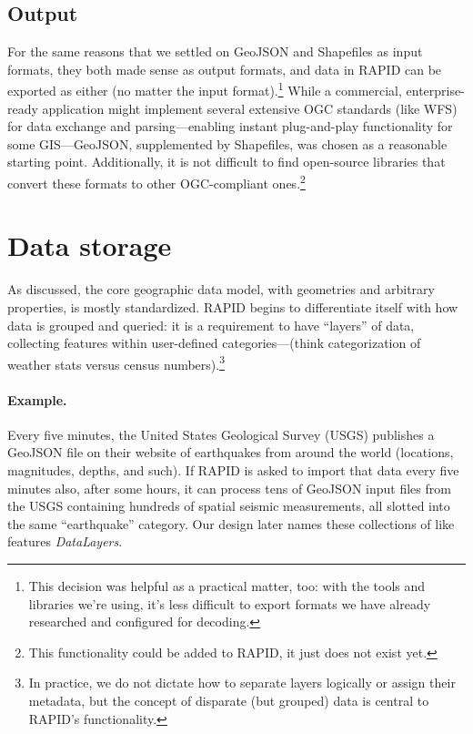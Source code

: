 \subsection{Output}
For the same reasons that we settled on GeoJSON and Shapefiles as input formats, they both made sense as output formats, and data in RAPID can be exported as either (no matter the input format).\footnote{This decision was helpful as a practical matter, too: with the tools and libraries we're using, it's less difficult to export formats we have already researched and configured for decoding.} While a commercial, enterprise-ready application might implement several extensive OGC standards (like WFS) for data exchange and parsing---enabling instant plug-and-play functionality for some GIS---GeoJSON, supplemented by Shapefiles, was chosen as a reasonable starting point. Additionally, it is not difficult to find open-source libraries that convert these formats to other OGC-compliant ones.\footnote{This functionality could be added to RAPID, it just does not exist yet.}

\section{Data storage}
\label{reqs_layers}
As discussed, the core geographic data model, with geometries and arbitrary properties, is mostly standardized. RAPID begins to differentiate itself with how data is grouped and queried: it is a requirement to have ``layers'' of data, collecting features within user-defined categories---(think categorization of weather stats versus census numbers).\footnote{In practice, we do not dictate how to separate layers logically or assign their metadata, but the concept of disparate (but grouped) data is central to RAPID's functionality.}

\paragraph{Example.}
Every five minutes, the United States Geological Survey (USGS) publishes a GeoJSON file on their website of earthquakes from around the world (locations, magnitudes, depths, and such). If RAPID is asked to import that data every five minutes also, after some hours, it can process tens of GeoJSON input files from the USGS containing hundreds of spatial seismic measurements, all slotted into the same ``earthquake'' category. Our design later names these collections of like features \textit{DataLayers}.


